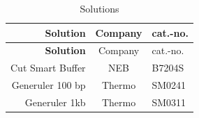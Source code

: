 \documentclass[11pt,singlespacinge,twoside]{reedthesis} %
\begin{document}
\begin{longtable}[]{@{}rcl@{}}
\caption{\label{tab:mat-sol} Solutions}\tabularnewline
\toprule
\begin{minipage}[b]{0.21\columnwidth}\raggedleft
\textbf{Solution}\strut
\end{minipage} & \begin{minipage}[b]{0.54\columnwidth}\centering
Company\strut
\end{minipage} & \begin{minipage}[b]{0.16\columnwidth}\raggedright
cat.-no.\strut
\end{minipage}\tabularnewline
\midrule
\endfirsthead
\toprule
\begin{minipage}[b]{0.21\columnwidth}\raggedleft
\textbf{Solution}\strut
\end{minipage} & \begin{minipage}[b]{0.54\columnwidth}\centering
Company\strut
\end{minipage} & \begin{minipage}[b]{0.16\columnwidth}\raggedright
cat.-no.\strut
\end{minipage}\tabularnewline
\midrule
\endhead
\begin{minipage}[t]{0.21\columnwidth}\raggedleft
Cut Smart Buffer\strut
\end{minipage} & \begin{minipage}[t]{0.54\columnwidth}\centering
NEB\strut
\end{minipage} & \begin{minipage}[t]{0.16\columnwidth}\raggedright
B7204S\strut
\end{minipage}\tabularnewline
\begin{minipage}[t]{0.21\columnwidth}\raggedleft
Generuler 100 bp\strut
\end{minipage} & \begin{minipage}[t]{0.54\columnwidth}\centering
Thermo\strut
\end{minipage} & \begin{minipage}[t]{0.16\columnwidth}\raggedright
SM0241\strut
\end{minipage}\tabularnewline
\begin{minipage}[t]{0.21\columnwidth}\raggedleft
Generuler 1kb\strut
\end{minipage} & \begin{minipage}[t]{0.54\columnwidth}\centering
Thermo\strut
\end{minipage} & \begin{minipage}[t]{0.16\columnwidth}\raggedright
SM0311\strut
\end{minipage}\tabularnewline
\bottomrule
\end{longtable}
\end{document}
